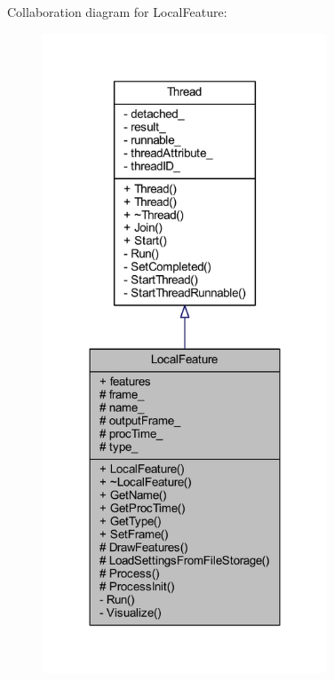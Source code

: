 Collaboration diagram for Local\-Feature\-:
\nopagebreak
\begin{figure}[H]
\begin{center}
\leavevmode
\includegraphics[width=240pt]{class_local_feature__coll__graph}
\end{center}
\end{figure}
